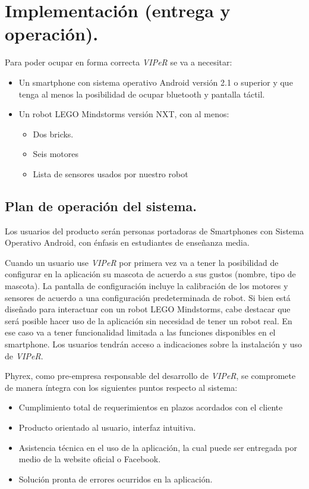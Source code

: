 \chapter{Implementaci\'on (entrega y operaci\'on).}
\newpage
Para poder ocupar en forma correcta \emph{VIPeR} se va a necesitar:
\begin{itemize}
\item Un smartphone con sistema operativo Android versi\'on 2.1 o superior y que tenga al menos la posibilidad de ocupar bluetooth y pantalla t\'actil.
\item Un robot LEGO Mindstorms versi\'on NXT, con al menos:
  \begin{itemize}
  \item Dos bricks. 
  \item Seis motores
  \item Lista de sensores usados por nuestro robot
  \end{itemize}
\end{itemize}

\section{Plan de operaci\'on del sistema.}
Los usuarios del producto ser\'an personas portadoras de Smartphones con Sistema Operativo Android, con \'enfasis en estudiantes de ense\~nanza media. 

Cuando un usuario use \emph{VIPeR} por primera vez va a tener la posibilidad de configurar en la aplicaci\'on su mascota de acuerdo a sus gustos (nombre, tipo de mascota). La pantalla de configuraci\'on incluye la calibraci\'on de los motores y sensores de acuerdo a una configuraci\'on predeterminada de robot. Si bien est\'a dise\~nado para interactuar con un robot LEGO Mindstorms, cabe destacar que ser\'a posible hacer uso de la aplicaci\'on sin necesidad de tener un robot real. En ese caso va a tener funcionalidad limitada a las funciones disponibles en el smartphone. Los usuarios tendr\'an acceso a indicaciones sobre la instalaci\'on y uso de \emph{VIPeR}.

Phyrex, como pre-empresa responsable del desarrollo de \emph{VIPeR}, se compromete de manera \'integra con los siguientes puntos respecto al sistema:
\begin{itemize}
\item Cumplimiento total de requerimientos en plazos acordados con el cliente
\item Producto orientado al usuario, interfaz intuitiva.
\item Asistencia t\'ecnica en el uso de la aplicaci\'on, la cual puede ser entregada por medio de la website oficial o Facebook.
\item Soluci\'on pronta de errores ocurridos en la aplicaci\'on.
\end{itemize}
\newpage
